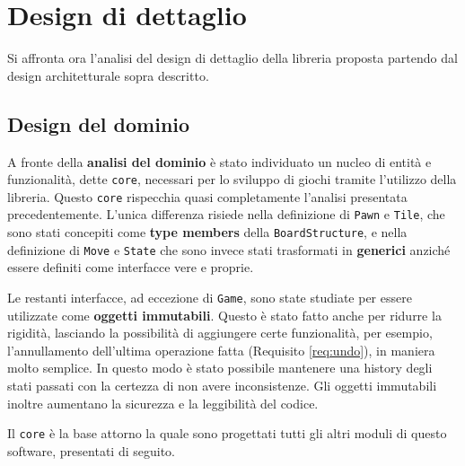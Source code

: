 \section{Design di dettaglio}\label{sec:detailed_design}



Si affronta ora l'analisi del design di dettaglio della libreria proposta partendo dal design architetturale sopra descritto.


\subsection{Design del dominio}
A fronte della \textbf{analisi del dominio} è stato individuato un nucleo di entità e funzionalità, dette \texttt{core}, necessari per lo sviluppo di giochi tramite l'utilizzo della libreria.
%
Questo \texttt{core} rispecchia quasi completamente l'analisi presentata precedentemente.
%
L'unica differenza risiede nella definizione di \texttt{Pawn} e \texttt{Tile}, che sono stati concepiti come \textbf{type members} della \texttt{BoardStructure}, e nella definizione di \texttt{Move} e \texttt{State} che sono invece stati trasformati in \textbf{generici} anziché essere definiti come interfacce vere e proprie.

Le restanti interfacce, ad eccezione di \texttt{Game}, sono state studiate per essere utilizzate come \textbf{oggetti immutabili}.
%
Questo è stato fatto anche per ridurre la rigidità, lasciando la possibilità di aggiungere certe funzionalità, per esempio, l'annullamento dell'ultima operazione fatta (Requisito \ref{req:undo}), in maniera molto semplice.
%
In questo modo è stato possibile mantenere una history degli stati passati con la certezza di non avere inconsistenze.
%
Gli oggetti immutabili inoltre aumentano la sicurezza e la leggibilità del codice.

Il \texttt{core} è la base attorno la quale sono progettati tutti gli altri moduli di questo software, presentati di seguito.

